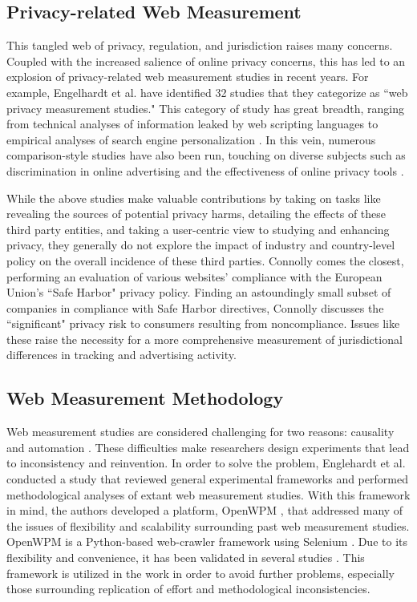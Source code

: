 \documentclass[conference]{IEEEtran}
\begin{document}
\subsection{Privacy-related Web Measurement}
This tangled web of privacy, regulation, and jurisdiction raises many concerns. Coupled with the increased salience of online privacy concerns, this has led to an explosion of privacy-related web measurement studies in recent years. For example, Engelhardt et al. \cite{openwpm_article} have identified 32 studies that they categorize as ``web privacy measurement studies." This category of study has great breadth, ranging from technical analyses of information leaked by web scripting languages \cite{jang} to empirical analyses of search engine personalization \cite{hannak}.  In this vein, numerous comparison-style studies have also been run, touching on diverse subjects such as discrimination in online advertising \cite{sweeney} and the effectiveness of online privacy tools \cite{balebako}.

While the above studies make valuable contributions by taking on tasks like revealing the sources of potential privacy harms, detailing the effects of these third party entities, and taking a user-centric view to studying and enhancing privacy, they generally do not explore the impact of industry and country-level policy on the overall incidence of these third parties. Connolly \cite{connolly} comes the closest, performing an evaluation of various websites' compliance with the European Union's ``Safe Harbor" privacy policy. Finding an astoundingly small subset of companies in compliance with Safe Harbor directives, Connolly discusses the ``significant" privacy risk to consumers resulting from noncompliance.  Issues like these raise the necessity for a more comprehensive measurement of jurisdictional differences in tracking and advertising activity.

\subsection{Web Measurement Methodology}
Web measurement studies are considered challenging for two reasons: causality and automation \cite{openwpm_article}. These difficulties make researchers design experiments that lead to inconsistency and reinvention. In order to solve the problem, Englehardt et al. conducted a study that reviewed general experimental frameworks and performed methodological analyses of extant web measurement studies. With this framework in mind, the authors developed a platform, OpenWPM \cite{openwpm}, that addressed many of the issues of flexibility and scalability surrounding past web measurement studies. 
OpenWPM is a Python-based web-crawler framework using Selenium \cite{Selenium}. Due to its flexibility and convenience, it has been validated in several studies \cite{openwpm}\cite{openwpm_article}. This framework is utilized in the work in order to avoid further problems, especially those surrounding replication of effort and methodological inconsistencies.
\end{document}

